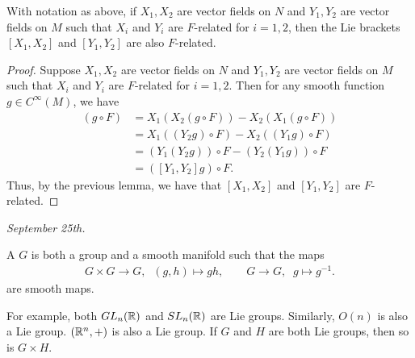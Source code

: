 \begin{lemma}
    With notation as above, if $X_{1},X_{2}$ are vector fields on $N$ and $Y_{1},Y_{2}$ are vector fields on $M$ such that $X_{i}$ and $Y_{i}$ are $F$-related for $i=1,2$, then the Lie brackets $[X_{1},X_{2}]$ and $[Y_{1},Y_{2}]$ are also $F$-related.
\end{lemma}
\begin{proof}
    Suppose $X_{1},X_{2}$ are vector fields on $N$ and $Y_{1},Y_{2}$ are vector fields on $M$ such that $X_{i}$ and $Y_{i}$ are $F$-related for $i=1,2$. Then for any smooth function $g \in C^{\infty}(M)$, we have
    \begin{align*}
        [X_{1},X_{2}](g \circ F) &= X_{1}(X_{2}(g \circ F)) - X_{2}(X_{1}(g \circ F)) \\
        &= X_{1}((Y_{2}g) \circ F) - X_{2}((Y_{1}g) \circ F) \\
        &= (Y_{1}(Y_{2}g)) \circ F - (Y_{2}(Y_{1}g)) \circ F \\
        &= ([Y_{1},Y_{2}]g) \circ F.
    \end{align*}
    Thus, by the previous lemma, we have that $[X_{1},X_{2}]$ and $[Y_{1},Y_{2}]$ are $F$-related.
\end{proof}

\textit{September 25th.}
\begin{definition}
    A  $G$ is both a group and a smooth manifold such that the maps
    \begin{align}
        G \times G \to G, \; \; (g,h) \mapsto gh, \qquad G \to G, \; \; g \mapsto g^{-1}.
    \end{align}
    are smooth maps.
\end{definition}
For example, both $GL_{n}(\mathbb{R})$ and $SL_{n}(\mathbb{R})$ are Lie groups. Similarly, $O(n)$ is also a Lie group. $(\mathbb{R}^{n},+)$ is also a Lie group. If $G$ and $H$ are both Lie groups, then so is $G \times H$.

